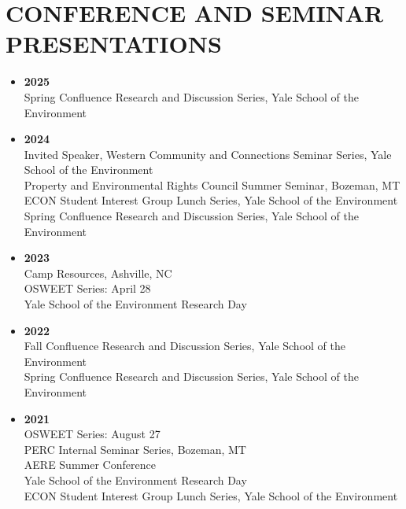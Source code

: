 \documentclass[11pt]{article}
\begin{document}
\section*{CONFERENCE AND SEMINAR PRESENTATIONS}
\begin{itemize}[left=0pt]
    \item \textbf{2025} \\
    Spring Confluence Research and Discussion Series, Yale School of the Environment
    \item \textbf{2024} \\
    Invited Speaker, Western Community and Connections Seminar Series, Yale School of the Environment \\
    Property and Environmental Rights Council Summer Seminar, Bozeman, MT \\
    ECON Student Interest Group Lunch Series, Yale School of the Environment \\
    Spring Confluence Research and Discussion Series, Yale School of the Environment
    \item \textbf{2023} \\
    Camp Resources, Ashville, NC \\
    OSWEET Series: April 28 \\
    Yale School of the Environment Research Day
    \item \textbf{2022} \\
    Fall Confluence Research and Discussion Series, Yale School of the Environment \\
    Spring Confluence Research and Discussion Series, Yale School of the Environment
    \item \textbf{2021} \\
    OSWEET Series: August 27 \\
    PERC Internal Seminar Series, Bozeman, MT \\
    AERE Summer Conference \\
    Yale School of the Environment Research Day \\
    ECON Student Interest Group Lunch Series, Yale School of the Environment
\end{itemize}
\end{document}
